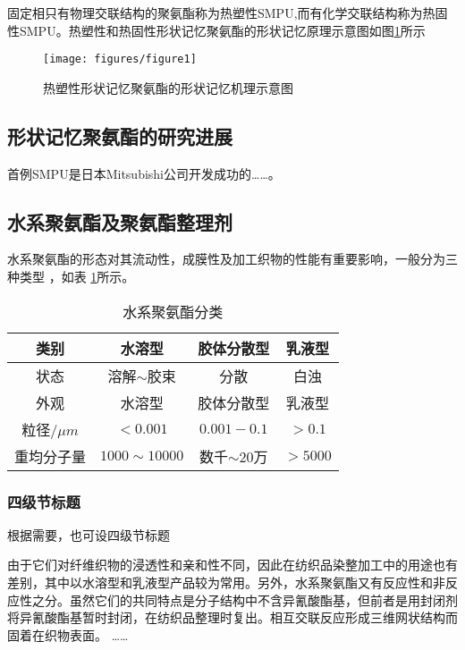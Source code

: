 固定相只有物理交联结构的聚氨酯称为热塑性SMPU,而有化学交联结构称为热固性SMPU。热塑性和热固性形状记忆聚氨酯的形状记忆原理示意图如图\ref{fig:diagram}所示

\begin{figure}
 \centering
 \texttt{[image: figures/figure1]}
 \caption{热塑性形状记忆聚氨酯的形状记忆机理示意图}\label{fig:diagram}
\end{figure}


\subsection{形状记忆聚氨酯的研究进展}
首例SMPU是日本Mitsubishi公司开发成功的……。

\subsection{水系聚氨酯及聚氨酯整理剂}

水系聚氨酯的形态对其流动性，成膜性及加工织物的性能有重要影响，一般分为三种类型\cite{Jiang2005Size} ，如表 \ref{tab:category}所示。

\begin{table}
  \centering
  \caption{水系聚氨酯分类} \label{tab:category}
  \begin{tabular*}{0.9\textwidth}{@{\extracolsep{\fill}}cccc}
  \toprule
    类别			&水溶型		&胶体分散型		&乳液型 \\
  \midrule
    状态			&溶解$\sim$胶束	&分散		&白浊 \\
    外观			&水溶型		&胶体分散型		&乳液型 \\
    粒径$/\mu m$	&$<0.001$		&$0.001-0.1$		&$>0.1$ \\
    重均分子量	&$1000\sim 10000$	&数千$\sim 20万$ &$>5000$ \\
  \bottomrule
  \end{tabular*}
\end{table}

\subsubsection{四级节标题}

根据需要，也可设四级节标题

由于它们对纤维织物的浸透性和亲和性不同，因此在纺织品染整加工中的用途也有差别，其中以水溶型和乳液型产品较为常用。另外，水系聚氨酯又有反应性和非反应性之分。虽然它们的共同特点是分子结构中不含异氰酸酯基，但前者是用封闭剂将异氰酸酯基暂时封闭，在纺织品整理时复出。相互交联反应形成三维网状结构而固着在织物表面。
……
